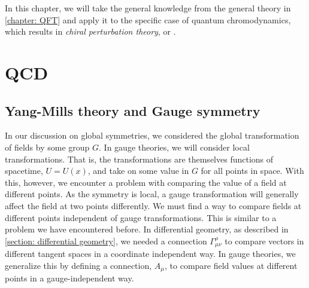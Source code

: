 In this chapter, we will take the general knowledge from the general theory in \autoref{chapter: QFT} and apply it to the specific case of quantum chromodynamics, which results in \emph{chiral perturbation theory}, or \chpt.

\section{QCD}

\subsection{Yang-Mills theory and Gauge symmetry}


In our discussion on global symmetries, we considered the global transformation of fields by some group $G$.
In gauge theories, we will consider local transformations.
That is, the transformations are themselves functions of spacetime, $U = U(x)$, and take on some value in $G$ for all points in space.
With this, however, we encounter a problem with comparing the value of a field at different points.
As the symmetry is local, a gauge transformation will generally affect the field at two points differently.
We must find a way to compare fields at different points independent of gauge transformations.
This is similar to a problem we have encountered before.
In differential geometry, as described in \autoref{section: differential geometry}, we needed a connection $\Gamma^\rho_{\mu \nu}$ to compare vectors in different tangent spaces in a coordinate independent way.
In gauge theories, we generalize this by defining a connection, $A_\mu$, to compare field values at different points in a gauge-independent way.

